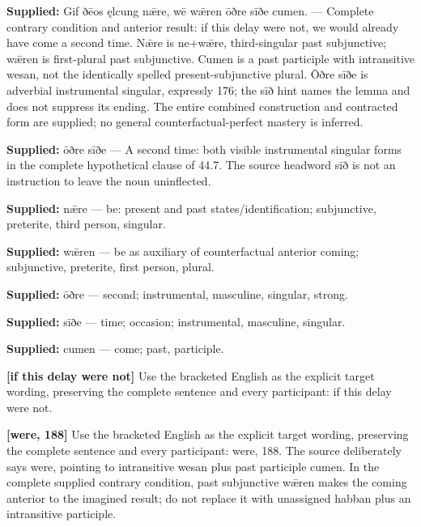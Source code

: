 \textbf{Supplied:} Gif ðēos ęlcung nǣre, wē wǣren ōðre sīðe cumen. — Complete contrary condition and anterior result: if this delay were not, we would already have come a second time. Nǣre is ne+wǣre, third-singular past subjunctive; wǣren is first-plural past subjunctive. Cumen is a past participle with intransitive wesan, not the identically spelled present-subjunctive plural. Ōðre sīðe is adverbial instrumental singular, expressly 176; the sīð hint names the lemma and does not suppress its ending. The entire combined construction and contracted form are supplied; no general counterfactual-perfect mastery is inferred.

\textbf{Supplied:} ōðre sīðe — A second time: both visible instrumental singular forms in the complete hypothetical clause of 44.7. The source headword sīð is not an instruction to leave the noun uninflected.

\textbf{Supplied:} nǣre — be: present and past states/\allowbreak{}identification; subjunctive, preterite, third person, singular.

\textbf{Supplied:} wǣren — be as auxiliary of counterfactual anterior coming; subjunctive, preterite, first person, plural.

\textbf{Supplied:} ōðre — second; instrumental, masculine, singular, strong.

\textbf{Supplied:} sīðe — time; occasion; instrumental, masculine, singular.

\textbf{Supplied:} cumen — come; past, participle.

\textbf{[if this delay were not]} Use the bracketed English as the explicit target wording, preserving the complete sentence and every participant: if this delay were not.

\textbf{[were, 188]} Use the bracketed English as the explicit target wording, preserving the complete sentence and every participant: were, 188. The source deliberately says were, pointing to intransitive wesan plus past participle cumen. In the complete supplied contrary condition, past subjunctive wǣren makes the coming anterior to the imagined result; do not replace it with unassigned habban plus an intransitive participle.


